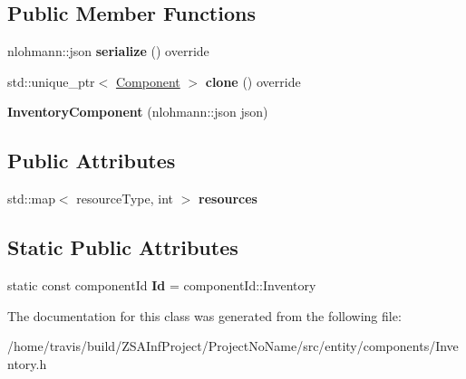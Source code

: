 \subsection*{Public Member Functions}
\begin{DoxyCompactItemize}
\item 
\hypertarget{classInventoryComponent_a4643ca88d9b096cccc48bdb625b0c2bc}{nlohmann\-::json {\bfseries serialize} () override}\label{classInventoryComponent_a4643ca88d9b096cccc48bdb625b0c2bc}

\item 
\hypertarget{classInventoryComponent_a7a179afb12bfadb46165122009936d40}{std\-::unique\-\_\-ptr$<$ \hyperlink{classComponent}{Component} $>$ {\bfseries clone} () override}\label{classInventoryComponent_a7a179afb12bfadb46165122009936d40}

\item 
\hypertarget{classInventoryComponent_a522908f358da92c142d490a05715d793}{{\bfseries Inventory\-Component} (nlohmann\-::json json)}\label{classInventoryComponent_a522908f358da92c142d490a05715d793}

\end{DoxyCompactItemize}
\subsection*{Public Attributes}
\begin{DoxyCompactItemize}
\item 
\hypertarget{classInventoryComponent_a0fcaede7f47ca14a2fa98c9645ab1058}{std\-::map$<$ resource\-Type, int $>$ {\bfseries resources}}\label{classInventoryComponent_a0fcaede7f47ca14a2fa98c9645ab1058}

\end{DoxyCompactItemize}
\subsection*{Static Public Attributes}
\begin{DoxyCompactItemize}
\item 
\hypertarget{classInventoryComponent_a58beae699ff5c9ad9ad278966f55442d}{static const component\-Id {\bfseries Id} = component\-Id\-::\-Inventory}\label{classInventoryComponent_a58beae699ff5c9ad9ad278966f55442d}

\end{DoxyCompactItemize}


The documentation for this class was generated from the following file\-:\begin{DoxyCompactItemize}
\item 
/home/travis/build/\-Z\-S\-A\-Inf\-Project/\-Project\-No\-Name/src/entity/components/Inventory.\-h\end{DoxyCompactItemize}
